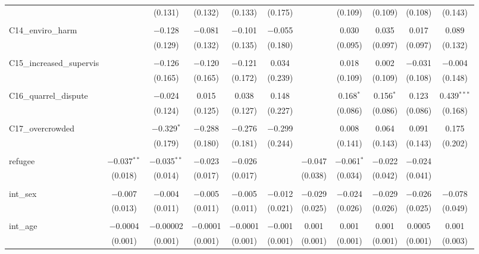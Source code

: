 \begin{table}[H]
\begin{tabular}{@{\extracolsep{4pt}}lcccccccccc}
  &  & (0.131) & (0.132) & (0.133) & (0.175) &  & (0.109) & (0.109) & (0.108) & (0.143) \\ 
  & & & & & & & & & & \\ 
 C14\_enviro\_harm &  & $-$0.128 & $-$0.081 & $-$0.101 & $-$0.055 &  & 0.030 & 0.035 & 0.017 & 0.089 \\ 
  &  & (0.129) & (0.132) & (0.135) & (0.180) &  & (0.095) & (0.097) & (0.097) & (0.132) \\ 
  & & & & & & & & & & \\ 
 C15\_increased\_supervis &  & $-$0.126 & $-$0.120 & $-$0.121 & 0.034 &  & 0.018 & 0.002 & $-$0.031 & $-$0.004 \\ 
  &  & (0.165) & (0.165) & (0.172) & (0.239) &  & (0.109) & (0.109) & (0.108) & (0.148) \\ 
  & & & & & & & & & & \\ 
 C16\_quarrel\_dispute &  & $-$0.024 & 0.015 & 0.038 & 0.148 &  & 0.168$^{*}$ & 0.156$^{*}$ & 0.123 & 0.439$^{***}$ \\ 
  &  & (0.124) & (0.125) & (0.127) & (0.227) &  & (0.086) & (0.086) & (0.086) & (0.168) \\ 
  & & & & & & & & & & \\ 
 C17\_overcrowded &  & $-$0.329$^{*}$ & $-$0.288 & $-$0.276 & $-$0.299 &  & 0.008 & 0.064 & 0.091 & 0.175 \\ 
  &  & (0.179) & (0.180) & (0.181) & (0.244) &  & (0.141) & (0.143) & (0.143) & (0.202) \\ 
  & & & & & & & & & & \\ 
 refugee & $-$0.037$^{**}$ & $-$0.035$^{**}$ & $-$0.023 & $-$0.026 &  & $-$0.047 & $-$0.061$^{*}$ & $-$0.022 & $-$0.024 &  \\ 
  & (0.018) & (0.014) & (0.017) & (0.017) &  & (0.038) & (0.034) & (0.042) & (0.041) &  \\ 
  & & & & & & & & & & \\ 
 int\_sex & $-$0.007 & $-$0.004 & $-$0.005 & $-$0.005 & $-$0.012 & $-$0.029 & $-$0.024 & $-$0.029 & $-$0.026 & $-$0.078 \\ 
  & (0.013) & (0.011) & (0.011) & (0.011) & (0.021) & (0.025) & (0.026) & (0.026) & (0.025) & (0.049) \\ 
  & & & & & & & & & & \\ 
 int\_age & $-$0.0004 & $-$0.00002 & $-$0.0001 & $-$0.0001 & $-$0.001 & 0.001 & 0.001 & 0.001 & 0.0005 & 0.001 \\ 
  & (0.001) & (0.001) & (0.001) & (0.001) & (0.001) & (0.001) & (0.001) & (0.001) & (0.001) & (0.003) \\ 

\end{tabular}
\end{table}
